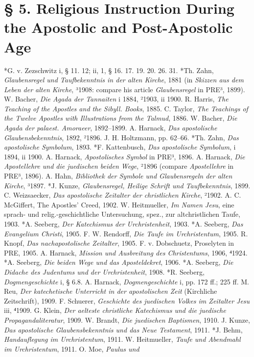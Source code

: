 \section[§ 5. Religious Instruction During the Apostolic Age]{§ 5. Religious Instruction During the Apostolic and Post-Apostolic Age}

*G. v. Zezschwitz i, § 11. 12; ii, 1, § 16. 17. 19. 20. 26. 31. *Th. Zahn, \emph{Glaubensregel und Taufbekenntnis in der alten Kirche}, 1881 (in \emph{Skizzen aus dem Leben der alten Kirche}, ³1908: compare his article \emph{Glaubensregel} in PRE³, 1899). W. Bacher, \emph{Die Agada der Tannaiten} i 1884, ²1903, ii 1900. R. Harris, \emph{The Teaching of the Apostles and the Sibyll. Books}, 1885. C. Taylor, \emph{The Teachings of the Twelve Apostles with Illustrations from the Talmud}, 1886. W. Bacher, \emph{Die Agada der palaest. Amoraeer}, 1892–1899. A. Harnack, \emph{Das apostolische Glaubensbekenntnis}, 1892, ²1896. J. H. Holtzmann, pp. 62–66. *Th. Zahn, \emph{Das apostolische Symbolum}, 1893. *F. Kattenbusch, \emph{Das apostolische Symbolum}, i 1894, ii 1900. A. Harnack, \emph{Apostolisches Symbol} in PRE³, 1896. A. Harnack, \emph{Die Apostellehre und die juedischen beiden Wege}, ²1896 (compare \emph{Apostellehre} in PRE³, 1896). A. Hahn, \emph{Bibliothek der Symbole und Glaubensregeln der alten Kirche}, ³1897. *J. Kunze, \emph{Glaubensregel, Heilige Schrift und Taufbekenntnis}, 1899. C. Weizsaecker, \emph{Das apostolische Zeitalter der christlichen Kirche}, ²1902. A. C. McGiffert, The Apostles' Creed, 1902. W. Heitmueller, \emph{Im Namen Jesu}, eine sprach- und relig.-geschichtliche Untersuchung, spez., zur altchristlichen Taufe, 1903. *A. Seeberg, \emph{Der Katechismus der Urchristenheit}, 1903. *A. Seeberg, \emph{Das Evangelium Christi}, 1905. F. W. Rendorff, \emph{Die Taufe im Urchristentum}, 1905. R. Knopf, \emph{Das nachapostolische Zeitalter}, 1905. F. v. Dobschuetz, Proselyten in PRE, 1905. A. Harnack, \emph{Mission und Ausbreitung des Christentums}, 1906, ⁴1924. *A. Seeberg, \emph{Die beiden Wege und das Aposteldekret}, 1906. *A. Seeberg, \emph{Die Didache des Judentums und der Urchristenheit}, 1908. *R. Seeberg, \emph{Dogmengeschichte} i, § 6.8. A. Harnack, \emph{Dogmengeschichte} i, pp. 172 ff.; 225 ff. M. Reu, \emph{Der katechetische Unterricht in der apostolischen Zeit} (Kirchliche Zeitschrift), 1909. F. Schuerer, \emph{Geschichte des juedischen Volkes im Zeitalter Jesu} iii, ⁴1909. G. Klein, \emph{Der aelteste christliche Katechismus und die juedische Propagandaliteratur}, 1909. W. Brandt, \emph{Die juedischen Baptismen}, 1910. J. Kunze, \emph{Das apostolische Glaubensbekenntnis und das Neue Testament}, 1911. *J. Behm, \emph{Handauflegung im Urchristentum}, 1911. W. Heitmueller, \emph{Taufe und Abendmahl im Urchristentum}, 1911. O. Moe, \emph{Paulus und}
